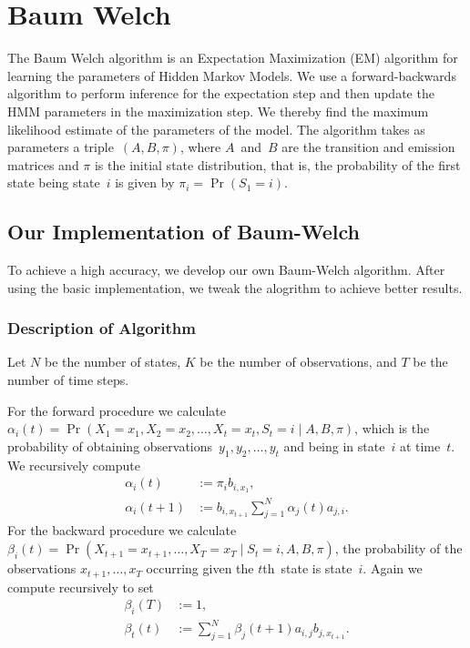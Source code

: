 \documentclass[twoside]{article}
\begin{document}
\section{Baum Welch}\label{sec:baum-welch}
The Baum Welch algorithm is an Expectation Maximization (EM) algorithm for learning the parameters of Hidden Markov Models.
We use a forward-backwards algorithm to perform inference for the expectation step and then update the HMM parameters in the maximization step.
We thereby find the maximum likelihood estimate of the parameters of the model.
The algorithm takes as parameters a triple~$(A, B, \pi)$, where $A$~and~$B$ are the transition and emission matrices and $\pi$ is the initial state distribution, that is, the probability of the first state being state~$i$ is given by ${\pi_i = \Pr(S_1 = i)}$.

\subsection{Our Implementation of Baum-Welch}\label{sec:expl-algor}

To achieve a high accuracy, we develop our own Baum-Welch algorithm.
After using the basic implementation, we tweak the alogrithm to achieve better results.

\subsubsection{Description of Algorithm}\label{sec:description-bw}

Let $N$ be the number of states, $K$ be the number of observations, and $T$ be the number of time steps.

For the forward procedure we calculate ${\alpha_i(t) = \Pr(X_1 = x_1, X_2 = x_2, \ldots, X_t = x_t, S_t = i \mid A, B, \pi)}$, which is the probability of obtaining observations~${y_1, y_2, \ldots, y_t}$ and being in state~$i$ at time~$t$.
We recursively compute
\begin{align*}
  \alpha_i (t) &:= \pi_i b_{i, x_1},\\
  \alpha_i (t + 1) &:= b_{i, x_{t+1}} \sum_{j=1}^N \alpha_j(t) a_{j, i}.
\end{align*}
For the backward procedure we calculate ${\beta_i(t) = \Pr(X_{t+1} = x_{t+1}, \ldots, X_T = x_T \mid S_t = i, A, B, \pi)}$, the probability of the observations ${x_{t+1}, \ldots, x_T}$ occurring given the $t$th~state is state~$i$.
Again we compute recursively to set
\begin{align*}
  \beta_i(T) &:= 1,\\
  \beta_t(t) &:= \sum_{j=1}^N \beta_j(t+1) a_{i, j} b_{j, x_{t+1}}.
\end{align*}
\end{document}

